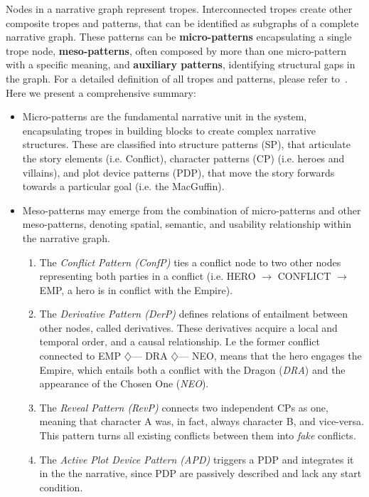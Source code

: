 Nodes in a narrative graph represent tropes. Interconnected tropes create other composite tropes and patterns, that can be identified as subgraphs of a complete narrative graph. These patterns can be \textbf{micro-patterns} encapsulating a single trope node, \textbf{meso-patterns}, often composed by more than one micro-pattern with a specific meaning, and \textbf{auxiliary patterns}, identifying structural gaps in the graph. For a detailed definition of all tropes and patterns, please refer to~\cite{p11alvarez_tropetwist_2022}. Here we present a comprehensive summary:

\begin{itemize}
    \item Micro-patterns are the fundamental narrative unit in the system, encapsulating tropes in building blocks to create complex narrative structures. These are classified into structure patterns (SP), that articulate the story elements (i.e. Conflict), character patterns (CP) (i.e. heroes and villains), and plot device patterns (PDP), that move the story forwards towards a particular goal (i.e. the MacGuffin).
    \item Meso-patterns may emerge from the combination of micro-patterns and other meso-patterns, denoting spatial, semantic, and usability relationship within the narrative graph.
    \begin{enumerate}
        \item The \emph{Conflict Pattern (ConfP)} ties a conflict node to two other nodes representing both parties in a conflict (i.e. HERO $\rightarrow$ CONFLICT $\rightarrow$ EMP, a hero is in conflict with the Empire).
        \item The \emph{Derivative Pattern (DerP)} defines relations of entailment between other nodes, called derivatives. These derivatives acquire a local and temporal order, and a causal relationship. I.e the former conflict connected to EMP $\diamondsuit$--- DRA $\diamondsuit$--- NEO, means that the hero engages the Empire, which entails both a conflict with the Dragon (\emph{DRA}) and the appearance of the Chosen One (\emph{NEO}).
        \item The \emph{Reveal Pattern (RevP)} connects two independent CPs as one, meaning that character A was, in fact, always character B, and vice-versa. This pattern turns all existing conflicts between them into \emph{fake} conflicts.
        \item The \emph{Active Plot Device Pattern (APD)} triggers a PDP and integrates it in the the narrative, since PDP are passively described and lack any start condition.

\end{enumerate}
\end{itemize}
